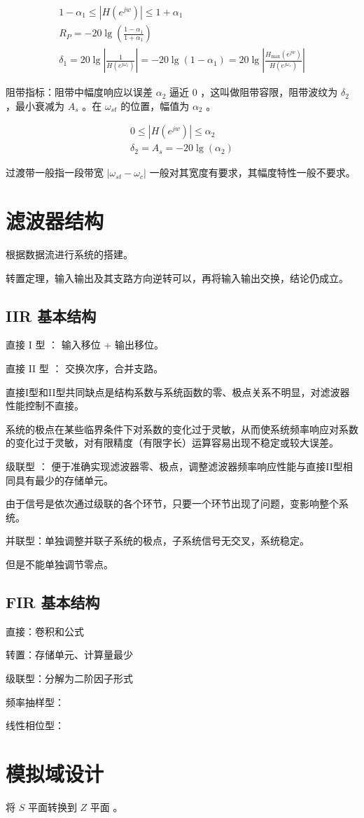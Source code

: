 \documentclass[cn,11pt,chinese,black,simple]{elegantbook}
\begin{document}
\[
\begin{array}{l}
1-\alpha_{1} \leq\left|H\left(e^{j w}\right)\right| \leq 1+\alpha_{1} \\
R_{P}=-20 \lg \left(\frac{1-\alpha_{1}}{1+\alpha_{1}}\right) \\
\delta_{1}=20 \lg \left|\frac{1}{H\left(e^{j \omega_{c}}\right)}\right|=-20 \lg \left(1-\alpha_{1}\right)=20 \lg \left|\frac{H_{\max }\left(e^{j w}\right)}{H\left(e^{j \omega_{c}}\right)}\right|
\end{array}
\]

阻带指标：阻带中幅度响应以误差 \(\alpha_2\) 逼近 \(0\) ，这叫做阻带容限，阻带波纹为 \(\delta_2\) ，最小衰减为 \(A_s\) 。在 \(\omega_{st}\) 的位置，幅值为 \(\alpha_2\) 。

\[
\begin{array}{l}
0 \leq\left|H\left(e^{j w}\right)\right| \leq \alpha_{2} \\
\delta_{2}=A_{s}=-20 \lg \left(\alpha_{2}\right)
\end{array}
\]

过渡带一般指一段带宽 \(|\omega_{st} - \omega_c|\) 一般对其宽度有要求，其幅度特性一般不要求。


\section{滤波器结构}

根据数据流进行系统的搭建。

转置定理，输入输出及其支路方向逆转可以，再将输入输出交换，结论仍成立。

\subsection{IIR 基本结构}

{直接 I 型} ： 输入移位 + 输出移位。

直接 II 型 ： 交换次序，合并支路。

直接I型和II型共同缺点是结构系数与系统函数的零、极点关系不明显，对滤波器性能控制不直接。

系统的极点在某些临界条件下对系数的变化过于灵敏，从而使系统频率响应对系数的变化过于灵敏，对有限精度（有限字长）运算容易出现不稳定或较大误差。

级联型 ： 便于准确实现滤波器零、极点，调整滤波器频率响应性能与直接II型相同具有最少的存储单元。

由于信号是依次通过级联的各个环节，只要一个环节出现了问题，变影响整个系统。

并联型：单独调整并联子系统的极点，子系统信号无交叉，系统稳定。

但是不能单独调节零点。

\subsection{FIR 基本结构}

直接：卷积和公式

转置：存储单元、计算量最少

级联型：分解为二阶因子形式

频率抽样型：

线性相位型：

\section{模拟域设计}


将 \(S\) 平面转换到 \(Z\) 平面 。


\let\chapname\undefined
\ifx\mainclass\undefined
\end{document}
